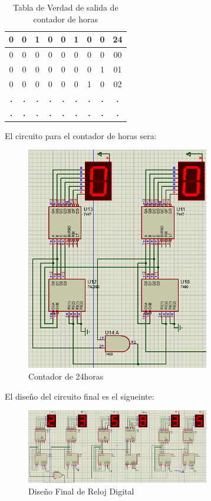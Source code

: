 \begin{table}[]
\begin{tabular}{|c|c|c|c|c|c|c|c|c|}
    \rowcolor[HTML]{F8FF00} 
    0 & 0 & 1 & 0 & 0 & 1 & 0 & 0 & 24 \\ \hline
    0 & 0 & 0 & 0 & 0 & 0 & 0 & 0 & 00 \\ \hline
    0 & 0 & 0 & 0 & 0 & 0 & 0 & 1 & 01 \\ \hline
    0 & 0 & 0 & 0 & 0 & 0 & 1 & 0 & 02 \\ \hline
    \textbf{.} & \textbf{.} & \textbf{.} & \textbf{.} & \textbf{.} & \textbf{.} & \textbf{.} & \textbf{.} & \textbf{.} \\ \hline
    \textbf{.} & \textbf{.} & \textbf{.} & \textbf{.} & \textbf{.} & \textbf{.} & \textbf{.} & \textbf{.} & \textbf{.} \\ \hline
    \end{tabular}
    \caption{Tabla de Verdad de salida de contador de horas}
    \label{tab_reloj}
    \end{table}
El circuito para el contador de horas sera:
\newline
\begin{figure}[h]
    \begin{center}
    \includegraphics[width=8cm]{images/image8.png}
    \newline
    \caption{Contador de 24horas}\label{cont_24}
    \end{center}
\end{figure}
\newline
El diseño del circuito final es el sigueinte:
\newline
    \begin{figure}[h]
        \begin{center}
        \includegraphics[width=8cm]{images/image9.png}
        \newline
        \caption{Diseño Final de Reloj Digital}\label{Diseño_final}
        \end{center}
    \end{figure}
